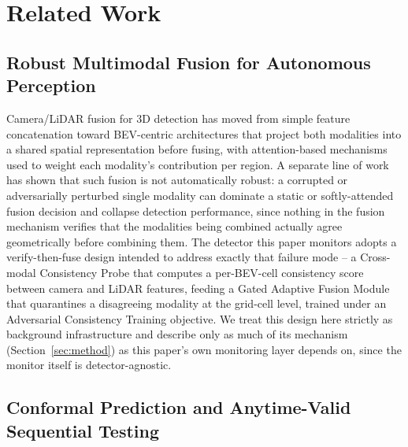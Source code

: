 \section{Related Work}
\label{sec:related}

\subsection{Robust Multimodal Fusion for Autonomous Perception}
\label{sec:related-fusion}

Camera/LiDAR fusion for 3D detection has moved from simple feature concatenation toward BEV-centric architectures that project both modalities into a shared spatial representation before fusing, with attention-based mechanisms used to weight each modality's contribution per region. A separate line of work has shown that such fusion is not automatically robust: a corrupted or adversarially perturbed single modality can dominate a static or softly-attended fusion decision and collapse detection performance, since nothing in the fusion mechanism verifies that the modalities being combined actually agree geometrically before combining them. The detector this paper monitors adopts a verify-then-fuse design intended to address exactly that failure mode -- a Cross-modal Consistency Probe that computes a per-BEV-cell consistency score between camera and LiDAR features, feeding a Gated Adaptive Fusion Module that quarantines a disagreeing modality at the grid-cell level, trained under an Adversarial Consistency Training objective. We treat this design here strictly as background infrastructure and describe only as much of its mechanism (Section~\ref{sec:method}) as this paper's own monitoring layer depends on, since the monitor itself is detector-agnostic.

\subsection{Conformal Prediction and Anytime-Valid Sequential Testing}
\label{sec:related-conformal}

